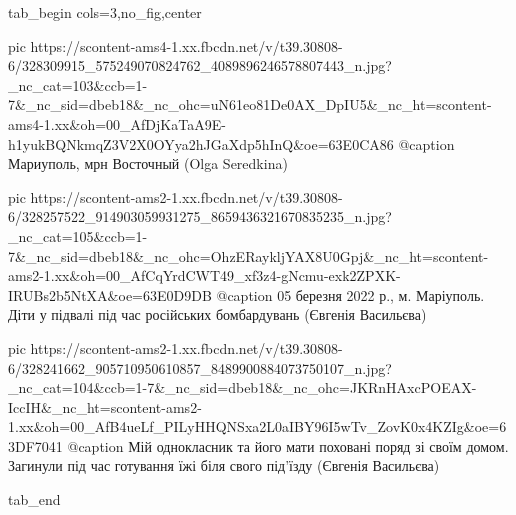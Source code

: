  
 
 
 
 

\clearpage
{}

\ifcmt
  tab_begin cols=3,no_fig,center

     pic https://scontent-ams4-1.xx.fbcdn.net/v/t39.30808-6/328309915_575249070824762_4089896246578807443_n.jpg?_nc_cat=103&ccb=1-7&_nc_sid=dbeb18&_nc_ohc=uN61eo81De0AX_DpIU5&_nc_ht=scontent-ams4-1.xx&oh=00_AfDjKaTaA9E-h1yukBQNkmqZ3V2X0OYya2hJGaXdp5hInQ&oe=63E0CA86
     @caption Мариуполь, мрн Восточный (Olga Seredkina)

     pic https://scontent-ams2-1.xx.fbcdn.net/v/t39.30808-6/328257522_914903059931275_8659436321670835235_n.jpg?_nc_cat=105&ccb=1-7&_nc_sid=dbeb18&_nc_ohc=OhzERaykljYAX8U0Gpj&_nc_ht=scontent-ams2-1.xx&oh=00_AfCqYrdCWT49_xf3z4-gNcmu-exk2ZPXK-IRUBs2b5NtXA&oe=63E0D9DB
     @caption 05 березня 2022 р., м. Маріуполь. Діти у підвалі під час російських бомбардувань (Євгенія Васильєва)

     pic https://scontent-ams2-1.xx.fbcdn.net/v/t39.30808-6/328241662_905710950610857_8489900884073750107_n.jpg?_nc_cat=104&ccb=1-7&_nc_sid=dbeb18&_nc_ohc=JKRnHAxcPOEAX-IccIH&_nc_ht=scontent-ams2-1.xx&oh=00_AfB4ueLf_PILyHHQNSxa2L0aIBY96I5wTv_ZovK0x4KZIg&oe=63DF7041
     @caption Мій однокласник та його мати поховані поряд зі своїм домом. Загинули під час готування їжі біля свого під'їзду (Євгенія Васильєва)

  tab_end
\fi
